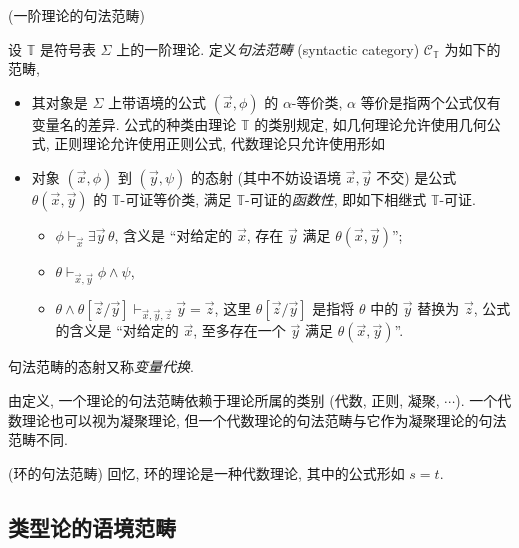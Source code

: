 \begin{definition}
	[label={first-order-theory-syntactic-category}]
	{(一阶理论的句法范畴)}
	
	设 $\mathbb T$ 是符号表 $\Sigma$ 上的一阶理论. 定义\emph{句法范畴} (syntactic category) $\mathcal C_{\mathbb T}$ 为如下的范畴,
	\begin{itemize}
		\item 其对象是 $\Sigma$ 上带语境的公式 $(\vec x , \phi)$ 的 $\alpha$-等价类, $\alpha$ 等价是指两个公式仅有变量名的差异. 公式的种类由理论 $\mathbb T$ 的类别规定, 如几何理论允许使用几何公式, 正则理论允许使用正则公式, 代数理论只允许使用形如
		\item 对象 $(\vec x , \phi)$ 到 $(\vec y , \psi)$ 的态射 (其中不妨设语境 $\vec x , \vec y$ 不交) 是公式 $\theta(\vec x,\vec y)$ 的 $\mathbb T$-可证等价类, 满足 $\mathbb T$-可证的\emph{函数性}, 即如下相继式 $\mathbb T$-可证.
		\begin{itemize}
			\item $\phi\vdash_{\vec x} \exists \vec y \,\theta$, 含义是 ``对给定的 $\vec x$, 存在 $\vec y$ 满足 $\theta(\vec x,\vec y)$'';
			\item $\theta\vdash_{\vec x,\vec y} \phi \wedge \psi$,
			\item $\theta \wedge \theta[\vec z/\vec y] \vdash_{\vec x,\vec y,\vec z} \vec y = \vec z$, 这里 $\theta[\vec z / \vec y]$ 是指将 $\theta$ 中的 $\vec y$ 替换为 $\vec z$, 公式的含义是 ``对给定的 $\vec x$, 至多存在一个 $\vec y$ 满足 $\theta(\vec x,\vec y)$''.
		\end{itemize}
	\end{itemize}
\end{definition}

\begin{remark}
	{}
	句法范畴的态射又称\emph{变量代换}.
\end{remark}

\begin{remark}
	{}
	由定义, 一个理论的句法范畴依赖于理论所属的类别 (代数, 正则, 凝聚, $\cdots$). 一个代数理论也可以视为凝聚理论, 但一个代数理论的句法范畴与它作为凝聚理论的句法范畴不同.
\end{remark}

\begin{example}
	{(环的句法范畴)}
	回忆, 环的理论是一种代数理论, 其中的公式形如 $s=t$.
\end{example}

\subsection{类型论的语境范畴}

